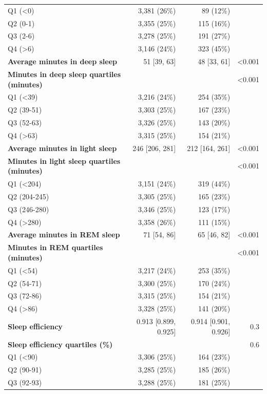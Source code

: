 \documentclass[11pt]{article}
\begin{document}
\begin{longtable}{@{}p{6.4cm}rrr@{}}
\quad Q1 (<0) & 3,381 (26\%) & 89 (12\%) &  \\
\quad Q2 (0-1) & 3,355 (25\%) & 115 (16\%) &  \\
\quad Q3 (2-6) & 3,278 (25\%) & 191 (27\%) &  \\
\quad Q4 (>6) & 3,146 (24\%) & 323 (45\%) &  \\
\textbf{Average minutes in deep sleep} & 51 [39, 63] & 48 [33, 61] & <0.001 \\
\textbf{Minutes in deep sleep quartiles (minutes)} &  &  & <0.001 \\
\quad Q1 (<39) & 3,216 (24\%) & 254 (35\%) &  \\
\quad Q2 (39-51) & 3,303 (25\%) & 167 (23\%) &  \\
\quad Q3 (52-63) & 3,326 (25\%) & 143 (20\%) &  \\
\quad Q4 (>63) & 3,315 (25\%) & 154 (21\%) &  \\
\textbf{Average minutes in light sleep} & 246 [206, 281] & 212 [164, 261] & <0.001 \\
\textbf{Minutes in light sleep quartiles (minutes)} &  &  & <0.001 \\
\quad Q1 (<204) & 3,151 (24\%) & 319 (44\%) &  \\
\quad Q2 (204-245) & 3,305 (25\%) & 165 (23\%) &  \\
\quad Q3 (246-280) & 3,346 (25\%) & 123 (17\%) &  \\
\quad Q4 (>280) & 3,358 (26\%) & 111 (15\%) &  \\
\textbf{Average minutes in REM sleep} & 71 [54, 86] & 65 [46, 82] & <0.001 \\
\textbf{Minutes in REM quartiles (minutes)} &  &  & <0.001 \\
\quad Q1 (<54) & 3,217 (24\%) & 253 (35\%) &  \\
\quad Q2 (54-71) & 3,300 (25\%) & 170 (24\%) &  \\
\quad Q3 (72-86) & 3,315 (25\%) & 154 (21\%) &  \\
\quad Q4 (>86) & 3,328 (25\%) & 141 (20\%) &  \\
\textbf{Sleep efficiency} & 0.913 [0.899, 0.925] & 0.914 [0.901, 0.926] & 0.3 \\
\textbf{Sleep efficiency quartiles (\%)} &  &  & 0.6 \\
\quad Q1 (<90) & 3,306 (25\%) & 164 (23\%) &  \\
\quad Q2 (90-91) & 3,285 (25\%) & 185 (26\%) &  \\
\quad Q3 (92-93) & 3,288 (25\%) & 181 (25\%) &  \\

\end{longtable}
\end{document}
